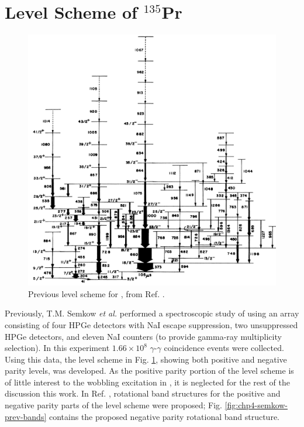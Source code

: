 \section{Level Scheme of $^{135}$Pr}
\label{sec:trw-lvl-scheme}
\begin{figure}[b!]
\centerline{\includegraphics[height=0.5\textheight]{./img/c4/old_scheme.png}}
	\caption{Previous level scheme for \pr{}, from Ref. \cite{semkow135Pr}. \label{fig:chp4-semkow-lvl-schm}}
\end{figure}
Previously, T.M. Semkow \emph{et al.} performed a spectroscopic study of \pr{} \cite{semkow135Pr} using an array consisting of four HPGe detectors with NaI escape suppression, two unsuppressed HPGe detectors, and eleven NaI counters (to provide gamma-ray multiplicity selection). In this experiment $1.66\times{}10^8$ $\gamma{}$-$\gamma{}$ coincidence events were collected. Using this data, the level scheme in Fig. \ref{fig:chp4-semkow-lvl-schm}, showing both positive and negative parity levels, was developed. As the positive parity portion of the level scheme is of little interest to the wobbling excitation in \pr{}, it is neglected for the rest of the discussion this work. In Ref. \cite{semkow135Pr}, rotational band structures for the positive and negative parity parts of the level scheme were proposed; Fig. \ref{fig:chp4-semkow-prev-bands} contains the proposed negative parity rotational band structure.
